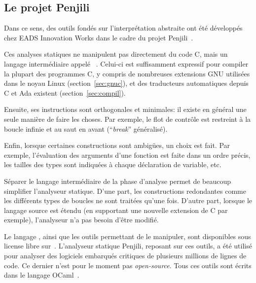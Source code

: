 

\subsection*{Le projet Penjili}

Dans ce sens, des outils fondés sur l'interprétation abstraite ont été
développés chez EADS Innovation Works dans le cadre du projet
Penjili~\cite{AllamigeonHymansSSTIC07}.

Ces analyses statiques ne manipulent pas directement du code C, mais un langage
intermédiaire appelé \newspeak~\cite{newspeak}. Celui-ci est suffisamment
expressif pour compiler la plupart des programmes C, y compris de nombreuses
extensions GNU utilisées dans le noyau Linux (section~\ref{sec:gnuc}), et des
traducteurs automatiques depuis C et Ada existent (section~\ref{sec:compil}).

Ensuite, ses instructions sont orthogonales et minimales: il existe en général
une seule manière de faire les choses. Par exemple, le flot de contrôle est
restreint à la boucle infinie et au saut en avant (\enquote{\emph{break}}
généralisé).

Enfin, lorsque certaines constructions sont ambigües, un choix est fait. Par
exemple, l'évaluation des arguments d'une fonction est faite dans un ordre
précis, les tailles des types sont indiquées à chaque déclaration de variable,
etc.

Séparer le langage intermédiaire de la phase d'analyse permet de beaucoup
simplifier l'analyseur statique. D'une part, les constructions redondantes comme
les différents types de boucles ne sont traitées qu'une fois. D'autre part,
lorsque le langage source est étendu (en supportant une nouvelle extension de C
par exemple), l'analyseur n'a pas besoin d'être modifié.

Le langage \newspeak, ainsi que les outils permettant de le manipuler, sont
disponibles sous license libre sur~. L'analyseur statique Penjili,
reposant sur ces outils, a été utilisé pour analyser des logiciels embarqués
critiques de plusieurs millions de lignes de code. Ce dernier n'est pour le
moment pas \emph{open-source}. Tous ces outils sont écrits dans le langage
OCaml~\cite{DAOC}.

